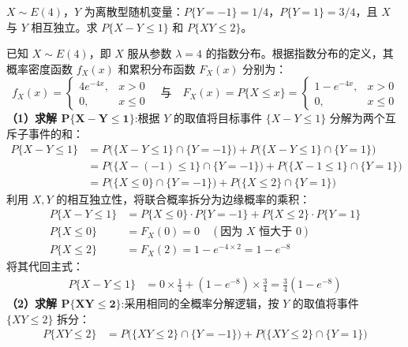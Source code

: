 \documentclass[lang=cn,11pt]{elegantbook}
\begin{document}
\begin{exercise}[混合型：连续+离散] \label{exer:3-c13}
$X \sim E(4)$，$Y$ 为离散型随机变量：$P\{Y=-1\} = 1/4$，$P\{Y=1\} = 3/4$，且 $X$ 与 $Y$ 相互独立。求 $P\{X-Y \leqslant 1\}$ 和 $P\{XY \leqslant 2\}$。
\end{exercise}
\begin{solution}
已知 $X \sim E(4)$，即 $X$ 服从参数 $\lambda = 4$ 的指数分布。根据指数分布的定义，其概率密度函数 $f_X(x)$ 和累积分布函数 $F_X(x)$ 分别为：
\[
f_X(x) = \begin{cases} 4e^{-4x}, & x > 0 \\ 0, & x \leqslant 0 \end{cases}
\quad \text{与} \quad
F_X(x) = P\{X \leqslant x\} = \begin{cases} 1 - e^{-4x}, & x > 0 \\ 0, & x \leqslant 0 \end{cases}
\]
\textbf{（1）求解 $\mathbf{P\{X-Y \leqslant 1\}}$}:根据 $Y$ 的取值将目标事件 $\{X-Y \leqslant 1\}$ 分解为两个互斥子事件的和：
\begin{align*}
P\{X-Y \leqslant 1\} &= P\big( \{X-Y \leqslant 1\} \cap \{Y=-1\} \big) + P\big( \{X-Y \leqslant 1\} \cap \{Y=1\} \big) \\
&= P\big( \{X-(-1) \leqslant 1\} \cap \{Y=-1\} \big) + P\big( \{X-1 \leqslant 1\} \cap \{Y=1\} \big) \\
&= P\big( \{X \leqslant 0\} \cap \{Y=-1\} \big) + P\big( \{X \leqslant 2\} \cap \{Y=1\} \big)
\end{align*}
利用 $X, Y$ 的相互独立性，将联合概率拆分为边缘概率的乘积：
\begin{align*}
P\{X-Y \leqslant 1\} &= P\{X \leqslant 0\} \cdot P\{Y=-1\} + P\{X \leqslant 2\} \cdot P\{Y=1\}\\
P\{X \leqslant 0\} &= F_X(0) = 0 \quad (\text{因为 } X \text{ 恒大于 } 0) \\
P\{X \leqslant 2\} &= F_X(2) = 1 - e^{-4 \times 2} = 1 - e^{-8}
\end{align*}
将其代回主式：
\begin{align*}
P\{X-Y \leqslant 1\} &= 0 \times \frac{1}{4} + (1 - e^{-8}) \times \frac{3}{4} = \frac{3}{4}(1 - e^{-8})
\end{align*}
\textbf{（2）求解 $\mathbf{P\{XY \leqslant 2\}}$}:采用相同的全概率分解逻辑，按 $Y$ 的取值将事件 $\{XY \leqslant 2\}$ 拆分：
\begin{align*}
P\{XY \leqslant 2\} &= P\big( \{XY \leqslant 2\} \cap \{Y=-1\} \big) + P\big( \{XY \leqslant 2\} \cap \{Y=1\} \big) \\

\end{align*}
\end{solution}
\end{document}
